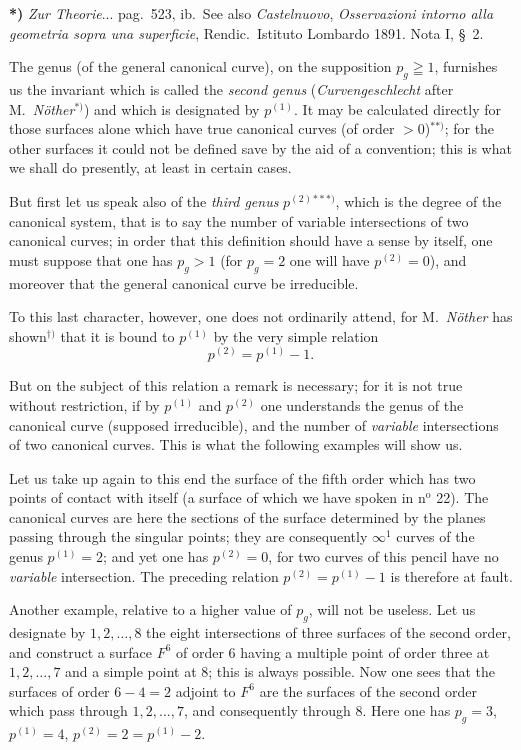 \documentclass{article}
\begin{document}
\textbf{*)} \emph{Zur Theorie}... pag.\ 523, ib.\ See also \emph{Castelnuovo}, \emph{Osservazioni intorno alla geometria sopra una superficie}, Rendic.\ Istituto Lombardo 1891. Nota I, §~2.


The genus (of the general canonical curve), on the supposition $p_{g} \geqq 1$, furnishes us the invariant which is called the \emph{second genus} (\emph{Curvengeschlecht} after M.\ \emph{Nöther}${}^{*)}$) and which is designated by $p^{(1)}$. It may be calculated directly for those surfaces alone which have true canonical curves (of order $> 0$)${}^{**)}$; for the other surfaces it could not be defined save by the aid of a convention; this is what we shall do presently, at least in certain cases.

But first let us speak also of the \emph{third genus} $p^{(2)}$${}^{***)}$, which is the degree of the canonical system, that is to say the number of variable intersections of two canonical curves; in order that this definition should have a sense by itself, one must suppose that one has $p_{g} > 1$ (for $p_{g} = 2$ one will have $p^{(2)} = 0$), and moreover that the general canonical curve be irreducible.

To this last character, however, one does not ordinarily attend, for M.\ \emph{Nöther} has shown${}^{\dagger)}$ that it is bound to $p^{(1)}$ by the very simple relation
\[
p^{(2)} = p^{(1)} - 1.
\]

But on the subject of this relation a remark is necessary; for it is not true without restriction, if by $p^{(1)}$ and $p^{(2)}$ one understands the genus of the canonical curve (supposed irreducible), and the number of \emph{variable} intersections of two canonical curves. This is what the following examples will show us.

Let us take up again to this end the surface of the fifth order which has two points of contact with itself (a surface of which we have spoken in n${}^{\text{o}}$ 22). The canonical curves are here the sections of the surface determined by the planes passing through the singular points; they are consequently $\infty^{1}$ curves of the genus $p^{(1)} = 2$; and yet one has $p^{(2)} = 0$, for two curves of this pencil have no \emph{variable} intersection. The preceding relation $p^{(2)} = p^{(1)} - 1$ is therefore at fault.

Another example, relative to a higher value of $p_{g}$, will not be useless. Let us designate by $1, 2, \ldots, 8$ the eight intersections of three surfaces of the second order, and construct a surface $F^{6}$ of order 6 having a multiple point of order three at $1, 2, \ldots, 7$ and a simple point at 8; this is always possible. Now one sees that the surfaces of order $6 - 4 = 2$ adjoint to $F^{6}$ are the surfaces of the second order which pass through $1, 2, \ldots, 7$, and consequently through 8. Here one has $p_{g} = 3$, $p^{(1)} = 4$, $p^{(2)} = 2 = p^{(1)} - 2$.
\end{document}
